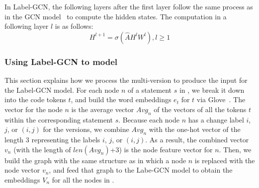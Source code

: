 
In Label-GCN, the following layers after the first layer follow the
same process as in the GCN model~\cite{yi} to compute the hidden
states. The computation in a following layer $l$ is as follows:
\begin{equation}\label{eq4}
	H^{l+1} = \sigma (\hat{A}H^lW^l), l \geq 1 
\end{equation}

\subsubsection{{\bf Using Label-GCN to model {\mvpdg}}}
\label{sec:preprocess}
This section explains how we process the multi-version {\mvpdg} to
produce the input for the Label-GCN model. For each node $n$ of a
statement $s$ in {\mvpdg}, we break it down into the code tokens $t$,
and build the word embeddings $e_t$ for $t$ via Glove~\cite{yi}. The vector
for the node $n$ is the average vector $Avg_n$ of the vectors of all
the tokens $t$ within the corresponding statement $s$. Because each
node $n$ has a change label $i$, $j$, or $(i,j)$ for the
versions, we combine $Avg_n$ with the one-hot vector of the length 3
representing the labels $i$, $j$, or $(i,j)$. As a result, the
combined vector $v_n$ (with the length of $len(Avg_n)$+3) is the node
feature vector for $n$. Then, we build the graph with the same
structure as {\mvpdg} in which a node $n$ is replaced with the node
vector $v_n$, and feed that graph to the Labe-GCN model to obtain the
embeddings $V_n$ for all the nodes in {\mvpdg}.


